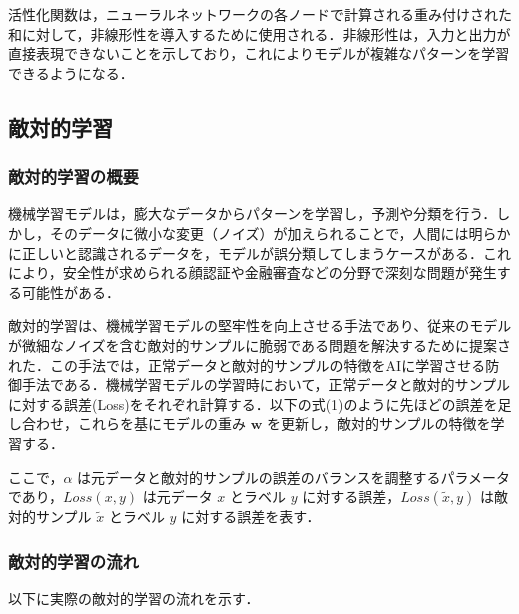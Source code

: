 活性化関数は，ニューラルネットワークの各ノードで計算される重み付けされた和に対して，非線形性を導入するために使用される．非線形性は，入力と出力が直接表現できないことを示しており，これによりモデルが複雑なパターンを学習できるようになる．\cite{kikagaku-NN}

\subsection{敵対的学習}
\subsubsection{敵対的学習の概要}
機械学習モデルは，膨大なデータからパターンを学習し，予測や分類を行う．しかし，そのデータに微小な変更（ノイズ）が加えられることで，人間には明らかに正しいと認識されるデータを，モデルが誤分類してしまうケースがある．これにより，安全性が求められる顔認証や金融審査などの分野で深刻な問題が発生する可能性がある．

敵対的学習は、機械学習モデルの堅牢性を向上させる手法であり、従来のモデルが微細なノイズを含む敵対的サンプルに脆弱である問題を解決するために提案された\cite{goodfellow2015explaining}．この手法では，正常データと敵対的サンプルの特徴をAIに学習させる防御手法である．機械学習モデルの学習時において，正常データと敵対的サンプルに対する誤差(Loss)をそれぞれ計算する．以下の式(1)のように先ほどの誤差を足し合わせ，これらを基にモデルの重み $\bm{w}$ を更新し，敵対的サンプルの特徴を学習する．


ここで，$\alpha$ は元データと敵対的サンプルの誤差のバランスを調整するパラメータであり，$Loss(x,y)$ は元データ $x$ とラベル $y$ に対する誤差，$Loss(\tilde{x},y)$ は敵対的サンプル $\tilde{x}$ とラベル $y$ に対する誤差を表す．

\subsubsection{敵対的学習の流れ}
以下に実際の敵対的学習の流れを示す．\cite{MBSD-AdversarialTraining}

